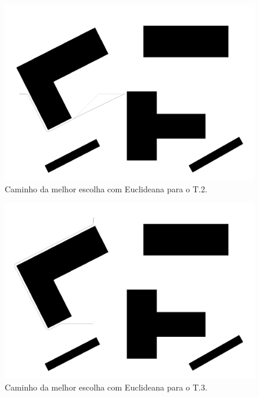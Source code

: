\documentclass[12pt]{article}
\theoremstyle{plain}
\numberwithin{equation}{section}
\begin{document}
\begin{figure}[H]
  \centering\includegraphics[scale=0.4]{imgs/best_choice_euclidean_2.png}
  \caption{Caminho da melhor escolha com Euclideana para o T.2.}
\end{figure}

\begin{figure}[H]
  \centering\includegraphics[scale=0.4]{imgs/best_choice_euclidean_3.png}
  \caption{Caminho da melhor escolha com Euclideana para o T.3.}
\end{figure}
\end{document}
